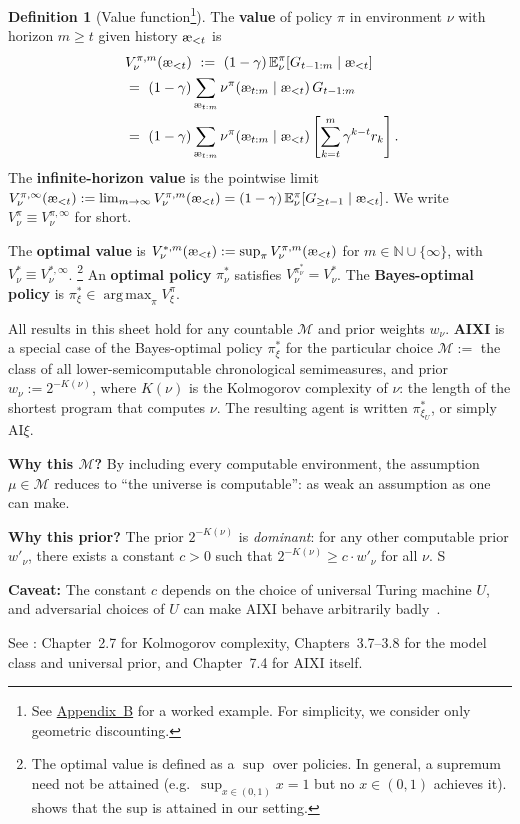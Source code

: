 \documentclass[fontsize=11pt, parskip=half]{scrartcl}
\theoremstyle{definition}
\newtheorem{definition}[theorem]{Definition}
\newcommand{\cM}{\mathcal{M}}
\newcommand{\Ex}{\mathbb{E}}
\DeclareMathOperator*{\argmax}{arg\,max}
\newcommand{\aes}{\textnormal{\ae}}
\begin{document}
\begin{definition}[Value function\footnote{See \hyperref[sec:appendix_value]{Appendix~B} for a worked example. For simplicity, we
    consider only geometric discounting.}]\label{def:value}
The \textbf{value} of policy $\pi$ in environment $\nu$ with horizon $m \geq t$ given history $\aes_{<t}$ is
\begin{align*}
    &V_\nu^{\pi,m}(\aes_{<t})
    ~:=~ (1-\gamma)\, \Ex_\nu^\pi\!\left[G_{t-1:m}  \mid \aes_{<t}\right] \\
    ~&=~ (1-\gamma) \sum_{\aes_{t:m}} \nu^\pi(\aes_{t:m} \mid \aes_{<t})\, G_{t-1:m} \\
    ~&=~ (1-\gamma) \sum_{\aes_{t:m}} \nu^\pi(\aes_{t:m} \mid \aes_{<t}) \left[ \sum_{k=t}^{m} \gamma^{k-t} r_k \right].
\end{align*}
The \textbf{infinite-horizon value} is the pointwise limit $V_\nu^{\pi,\infty}(\aes_{<t}) := \lim_{m \to \infty} V_\nu^{\pi,m}(\aes_{<t}) = (1-\gamma)\, \Ex_\nu^\pi[G_{\geq t-1} \mid \aes_{<t}]$.
We write $V_\nu^\pi \equiv V_\nu^{\pi,\infty}$ for short.

The \textbf{optimal value} is $V_\nu^{*,m}(\aes_{<t}) := \sup_\pi V_\nu^{\pi,m}(\aes_{<t})$ for $m \in \mathbb{N} \cup \{\infty\}$, with $V_\nu^* \equiv V_\nu^{*,\infty}$.%
\footnote{The optimal value is defined as a $\sup$ over policies.
In general, a supremum need not be attained (e.g.\ $\sup_{x \in (0,1)} x = 1$ but no $x \in (0,1)$ achieves it).
 shows that the sup is attained in our setting.}
An \textbf{optimal policy} $\pi_\nu^*$ satisfies $V_\nu^{\pi_\nu^*} = V_\nu^*$.
The \textbf{Bayes-optimal policy} is $\pi_\xi^* \in \argmax_\pi V_\xi^\pi$.
\end{definition}

\begin{defbox}[AIXI]
All results in this sheet hold for any countable $\cM$ and prior weights $w_\nu$.
\textbf{AIXI} is a special case of the Bayes-optimal policy $\pi_\xi^*$ for the particular choice $\cM :=$ the class of all lower-semicomputable chronological semimeasures, and prior $w_\nu := 2^{-K(\nu)}$, where $K(\nu)$ is the Kolmogorov complexity of $\nu$: the length of the shortest program that computes $\nu$.
The resulting agent is written $\pi^*_{\xi_U}$, or simply AI$\xi$.

\textbf{Why this $\cM$?}
By including every computable environment, the assumption $\mu \in \cM$ reduces to ``the universe is computable'': as weak an assumption as one can make.

\textbf{Why this prior?}
The prior $2^{-K(\nu)}$ is \emph{dominant}: for any other computable prior $w'_\nu$, there exists a constant $c > 0$ such that $2^{-K(\nu)} \geq c \cdot w'_\nu$ for all $\nu$. S

\textbf{Caveat:}
The constant $c$ depends on the choice of universal Turing machine $U$, and adversarial choices of $U$ can make AIXI behave arbitrarily badly~\cite{Leike:15badpriors}.

See \cite{Hutter:24uaibook2}: Chapter~2.7 for Kolmogorov complexity, Chapters~3.7--3.8 for the model class and universal prior, and Chapter~7.4 for AIXI itself.
\end{defbox}
\end{document}
